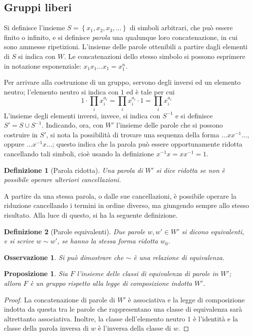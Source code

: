 \documentclass[12pt]{scrartcl}
\theoremstyle{style}
\newtheorem{definizione}{Definizione}[section]
\newtheorem{prop}{Proposizione}[section]
\newtheorem{osservazione}{Osservazione}[section]
\numberwithin{equation}{subsection}
\begin{document}
\subsection{Gruppi liberi}
Si definisce l'insieme $S=\left\{ x_1,x_2,x_3,\ldots \right\} $ di simboli arbitrari, che pu\`o essere finito o infinito, e si definisce \textit{parola} una qualunque loro concatenazione, in cui sono ammesse ripetizioni. 
L'insieme delle parole ottenibili a partire dagli elementi di $S$ si indica con $W $.
Le concatenazioni dello stesso simbolo si possono esprimere in notazione esponenziale: $x_1 x_1 \ldots x_1 = x_1^n$.

Per arrivare alla costruzione di un gruppo, servono degli inversi ed un elemento neutro; l'elemento neutro si indica con $1$ ed \`e tale per cui
\[
1 \cdot \prod_{i} x_i^{a_i} = \prod_{i} x_i^{a_i} \cdot 1 = \prod_{i} x_i^{a_i} 
\] 
L'insieme degli elementi inversi, invece, si indica con $S^{-1}$ e si definisce $S' = S \cup S^{-1}$.
Indicando, ora, con $W'$ l'insieme delle parole che si possono costruire in $S'$, si nota la possibilit\`a di trovare una sequenza della forma $\ldots x x^{-1}\ldots$, oppure $\ldots x^{-1}x \ldots$; questo indica che la parola pu\`o essere opportunamente ridotta cancellando tali simboli, cio\`e usando la definizione $x^{-1} x = x x^{-1}= 1$.
\begin{definizione}
	[Parola ridotta]
	Una parola di $W'$ si dice \textit{ridotta} se non \`e possibile operare ulteriori cancellazioni.
\end{definizione}
\noindent A partire da una stessa parola, o dalle sue cancellazioni, \`e possibile operare la riduzione cancellando i termini in ordine diverso, ma giungendo sempre allo stesso risultato.
Alla luce di questo, si ha la seguente definizione.
\begin{definizione}
	[Parole equivalenti]
	Due parole $w, w' \in W'$ si dicono \textit{equivalenti}, e si scrive $w \sim w'$, se hanno la stessa forma ridotta $w_0$.
\end{definizione}
\begin{osservazione}
	Si pu\`o dimostrare che $\sim$ \`e una relazione di equivalenza.
\end{osservazione}
\begin{prop}
	Sia $F$ l'insieme delle classi di equivalenza di parole in $W'$; allora $F$ \`e un gruppo rispetto alla legge di composizione indotta $W'$.
\end{prop}
	\begin{proof}
		La concatenazione di parole di $W'$ \`e associativa e la legge di composizione indotta da questa tra le parole che rappresentano una classe di equivalenza sar\`a altrettanto associativa.
		Inoltre, la classe dell'elemento neutro $1$ \`e l'identit\`a e la classe della parola inversa di $w$ \`e l'inversa della classe di $w$.
	\end{proof}
\end{document}
